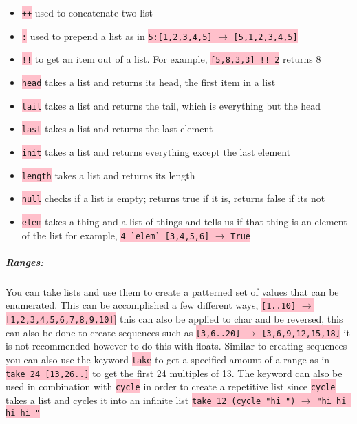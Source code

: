 \documentclass{article}
\begin{document}
\begin{itemize}
\item \colorbox{pink}{ \lstinline{++}} used to concatenate two list

\item \colorbox{pink}{ \lstinline{:}} used to prepend a list as in \colorbox{pink}{ \lstinline{5:[1,2,3,4,5]} $\rightarrow$ \lstinline{[5,1,2,3,4,5]}}

\item \colorbox{pink}{ \lstinline{!!}} to get an item out of a list. For example, \colorbox{pink}{ \lstinline{[5,8,3,3] !! 2}} returns 8 

\item \colorbox{pink}{ \lstinline{head}} takes a list and returns its head, the first item in a list 

\item \colorbox{pink}{ \lstinline{tail}} takes a list and returns the tail, which is everything but the head

\item \colorbox{pink}{ \lstinline{last}} takes a list and returns the last element

\item \colorbox{pink}{ \lstinline{init}} takes a list and returns everything except the last element 

\item \colorbox{pink}{ \lstinline{length}} takes a list and returns its length

\item \colorbox{pink}{ \lstinline{null}} checks if a list is empty; returns true if it is, returns false if its not

\item \colorbox{pink}{ \lstinline{elem}} takes a thing and a list of things and tells us if that thing is an element of the list for example, \colorbox{pink}{ \lstinline{4 `elem` [3,4,5,6]} $\rightarrow$ \lstinline{True}}
\end{itemize}

\subparagraph{Ranges:}  

You can take lists and use them to create a patterned set of values that can be enumerated. This can be accomplished a few different ways, \colorbox{pink}{ \lstinline{[1..10]} $\rightarrow$  \lstinline{[1,2,3,4,5,6,7,8,9,10]}]} this can also be applied to char and be reversed, this can also be done to create sequences such as \colorbox{pink}{ \lstinline{[3,6..20]} $\rightarrow$ \lstinline{[3,6,9,12,15,18]}} it is not recommended however to do this with floats. Similar to creating sequences you can also use the keyword \colorbox{pink}{ \lstinline{take}} to get a specified amount of a range as in \colorbox{pink}{ \lstinline{take 24 [13,26..]}} to get the first 24 multiples of 13. The keyword can also be used in combination with \colorbox{pink}{ \lstinline{cycle}} in order to create a repetitive list since \colorbox{pink}{ \lstinline{cycle}} takes a list and cycles it into an infinite list \colorbox{pink}{ \lstinline{take 12 (cycle "hi ")} $\rightarrow$ \lstinline{"hi hi hi hi "}}
\end{document}
